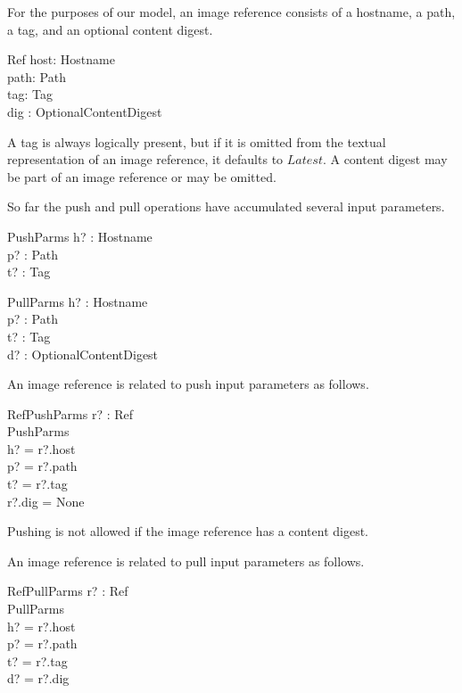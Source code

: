 \documentclass[a4paper,twoside,12pt]{article}
\begin{document}
For the purposes of our model, an image reference consists of a hostname, a path, a tag, and an optional content digest.
\begin{schema}{Ref}
    host: Hostname \\
    path: Path \\
    tag: Tag \\
    dig : OptionalContentDigest \\
\end{schema}
A tag is always logically present, but if it is omitted from the textual representation of an image reference, it defaults to $Latest$.
A content digest may be part of an image reference or may be omitted.

So far the push and pull operations have accumulated several input parameters.
\begin{schema}{PushParms}
    h? : Hostname \\
    p? : Path \\
    t? : Tag \\
\end{schema}
\begin{schema}{PullParms}
    h? : Hostname \\
    p? : Path \\
    t? : Tag \\
    d? : OptionalContentDigest \\
\end{schema}

An image reference is related to push input parameters as follows.
\begin{schema}{RefPushParms}
    r? : Ref \\
    PushParms \\
\where
    h? = r?.host \\
    p? = r?.path \\
    t? = r?.tag \\
    r?.dig = None \\
\end{schema}
Pushing is not allowed if the image reference has a content digest.

An image reference is related to pull input parameters as follows.
\begin{schema}{RefPullParms}
    r? : Ref \\
    PullParms \\
\where
    h? = r?.host \\
    p? = r?.path \\
    t? = r?.tag \\
    d? = r?.dig \\
\end{schema}
\end{document}
